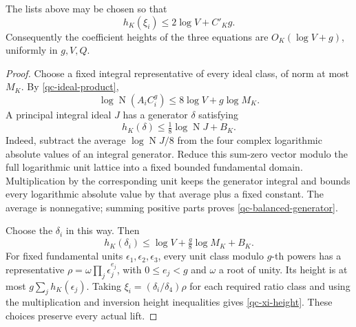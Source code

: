 \begin{theorem}\label{qc-coefficient-height}
The lists above may be chosen so that
\begin{equation}\label{qc-xi-height}
 h_K(\xi_i)\le2\log V+C'_Kg.
\end{equation}
Consequently the coefficient heights of the three equations are
$O_K(\log V+g)$, uniformly in $g,V,Q$.
\end{theorem}
\begin{proof}
Choose a fixed integral representative of every ideal class, of norm
at most $M_K$. By \eqref{qc-ideal-product},
\[
 \log\operatorname N(A_iC_i^g)\le8\log V+g\log M_K.
\]
A principal integral ideal $J$ has a generator $\delta$ satisfying
\begin{equation}\label{qc-balanced-generator}
 h_K(\delta)\le\tfrac18\log\operatorname N J+B_K.
\end{equation}
Indeed, subtract the average $\log\operatorname N J/8$ from the
four complex logarithmic absolute values of an integral generator.
Reduce this sum-zero vector modulo the full logarithmic unit lattice
into a fixed bounded fundamental domain. Multiplication by the
corresponding unit keeps the generator integral and bounds every
logarithmic absolute value by that average plus a fixed constant.
The average is nonnegative; summing positive parts proves
\eqref{qc-balanced-generator}.

Choose the $\delta_i$ in this way. Then
\[
 h_K(\delta_i)\le\log V+\tfrac g8\log M_K+B_K.
\]
For fixed fundamental units $\epsilon_1,\epsilon_2,\epsilon_3$,
every unit class modulo $g$-th powers has a representative
$\rho=\omega\prod_j\epsilon_j^{e_j}$, with $0\le e_j<g$ and
$\omega$ a root of unity. Its height is at most
$g\sum_jh_K(\epsilon_j)$. Taking
$\xi_i=(\delta_i/\delta_4)\rho$ for each required ratio class and
using the multiplication and inversion height inequalities gives
\eqref{qc-xi-height}. These choices preserve every actual lift.
\end{proof}

